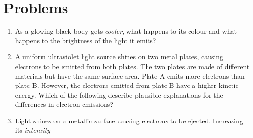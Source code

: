 \section*{Problems}

\begin{enumerate}[itemsep=6pt]
\item As a glowing black body gets \emph{cooler}, what happens to its
  colour and what happens to the brightness of the light it emits?
  
\item A uniform ultraviolet light source shines on two metal plates, causing
  electrons to be emitted from both plates. The two plates are made of
  different materials but have the same surface area. Plate A emits more
  electrons than plate B. However, the electrons emitted from plate B have a
  higher kinetic energy. Which of the following describe plausible explanations
  for the differences in electron emissions?
  
\item Light shines on a metallic surface causing electrons to be ejected.
  Increasing its \emph{intensity}
  

\end{enumerate}
